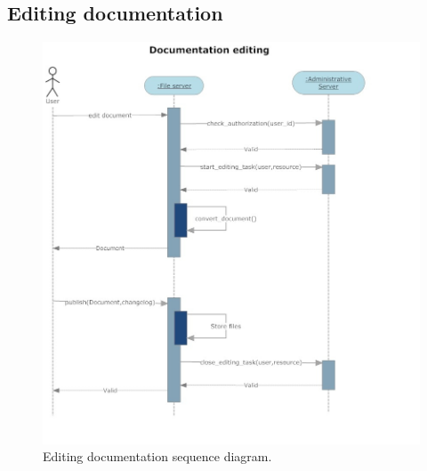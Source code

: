 \subsection{Editing documentation}
\begin{figure}[H]
\begin{centering}
\includegraphics[scale=0.45]{assign3/sdraw/imgs/editing.jpg}
\caption{Editing documentation sequence diagram.}
\label{3img:[sequence]editing}
\end{centering}
\end{figure}